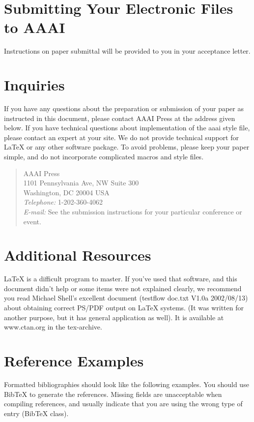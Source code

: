 \section{Submitting Your Electronic Files to AAAI}
Instructions on paper submittal will be provided to you in your acceptance letter.

\section{Inquiries}
If you have any questions about the preparation or submission of your paper as instructed in this document, please contact AAAI Press at the address given below. If you have technical questions about implementation of the aaai style file, please contact an expert at your site. We do not provide technical support for \LaTeX{} or any other software package. To avoid problems, please keep your paper simple, and do not incorporate complicated macros and style files.

\begin{quote}
\noindent AAAI Press\\
1101 Pennsylvania Ave, NW Suite 300\\
Washington, DC 20004 USA\\
\textit{Telephone:} 1-202-360-4062\\
\textit{E-mail:} See the submission instructions for your particular conference or event.
\end{quote}

\section{Additional Resources}
\LaTeX{} is a difficult program to master. If you've used that software, and this document didn't help or some items were not explained clearly, we recommend you read Michael Shell's excellent document (testflow doc.txt V1.0a 2002/08/13) about obtaining correct PS/PDF output on \LaTeX{} systems. (It was written for another purpose, but it has general application as well). It is available at www.ctan.org in the tex-archive.

\appendix
\section{Reference Examples}
\label{sec:reference_examples}

\nobibliography*
Formatted bibliographies should look like the following examples. You should use BibTeX to generate the references. Missing fields are unacceptable when compiling references, and usually indicate that you are using the wrong type of entry (BibTeX class).

